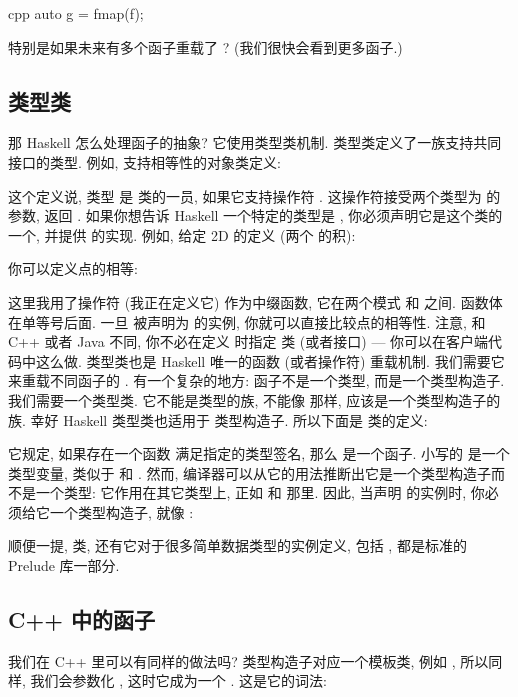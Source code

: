 \begin{snip}{cpp}
auto g = fmap(f);
\end{snip}
特别是如果未来有多个函子重载了 ? (我们很快会看到更多函子.)

\subsection{类型类}

那 Haskell 怎么处理函子的抽象? 它使用类型类机制. 类型类定义了一族支持共同接口的类型. 例如, 支持相等性的对象类定义:

这个定义说, 类型  是  类的一员, 如果它支持操作符 \code{(==)}. 这操作符接受两个类型为  的参数,
返回 . 如果你想告诉 Haskell 一个特定的类型是 , 你必须声明它是这个类的一个,
并提供 \code{(==)} 的实现. 例如, 给定 2D  的定义 (两个  的积):

你可以定义点的相等:

这里我用了操作符 \code{(==)} (我正在定义它) 作为中缀函数, 它在两个模式  和  之间.
函数体在单等号后面. 一旦  被声明为  的实例, 你就可以直接比较点的相等性. 注意, 和 C++ 或者 Java 不同,
你不必在定义  时指定  类 (或者接口) --- 你可以在客户端代码中这么做. 类型类也是 Haskell 唯一的函数
(或者操作符) 重载机制. 我们需要它来重载不同函子的 . 有一个复杂的地方: 函子不是一个类型, 而是一个类型构造子.
我们需要一个类型类. 它不能是类型的族, 不能像  那样, 应该是一个类型构造子的族. 幸好 Haskell 类型类也适用于
类型构造子. 所以下面是  类的定义:

它规定, 如果存在一个函数  满足指定的类型签名, 那么  是一个函子. 小写的  是一个类型变量,
类似于  和 . 然而, 编译器可以从它的用法推断出它是一个类型构造子而不是一个类型: 它作用在其它类型上,
正如  和  那里. 因此, 当声明  的实例时, 你必须给它一个类型构造子, 就像 :

顺便一提,  类, 还有它对于很多简单数据类型的实例定义, 包括 , 都是标准的 Prelude 库一部分.

\subsection{C++ 中的函子}

我们在 C++ 里可以有同样的做法吗? 类型构造子对应一个模板类, 例如 , 所以同样, 我们会参数化 ,
这时它成为一个  . 这是它的词法:

